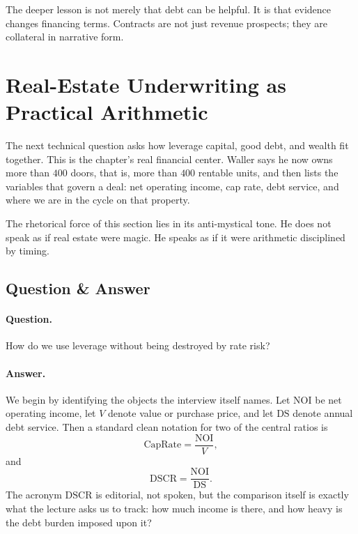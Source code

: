 The deeper lesson is not merely that debt can be helpful. It is that evidence changes financing terms. Contracts are not just revenue prospects; they are collateral in narrative form.

\section{Real-Estate Underwriting as Practical Arithmetic}

The next technical question asks how leverage capital, good debt, and wealth fit together. This is the chapter's real financial center. Waller says he now owns more than \(400\) doors, that is, more than \(400\) rentable units, and then lists the variables that govern a deal: net operating income, cap rate, debt service, and where we are in the cycle on that property.

The rhetorical force of this section lies in its anti-mystical tone. He does not speak as if real estate were magic. He speaks as if it were arithmetic disciplined by timing.

\subsection{Question \& Answer}

\paragraph{Question.} How do we use leverage without being destroyed by rate risk?

\paragraph{Answer.} We begin by identifying the objects the interview itself names. Let \(\mathrm{NOI}\) be net operating income, let \(V\) denote value or purchase price, and let \(\mathrm{DS}\) denote annual debt service. Then a standard clean notation for two of the central ratios is
\begin{equation}
\mathrm{CapRate} = \frac{\mathrm{NOI}}{V},
\end{equation}
and
\begin{equation}
\mathrm{DSCR} = \frac{\mathrm{NOI}}{\mathrm{DS}}.
\end{equation}
The acronym \(\mathrm{DSCR}\) is editorial, not spoken, but the comparison itself is exactly what the lecture asks us to track: how much income is there, and how heavy is the debt burden imposed upon it?

